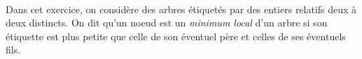 \documentclass[11pt,a4paper]{article}
\begin{document}
\begin{Exercise}[title = {Minima locaux dans des arbres}, origin = {\bac \; Oraux {\sc ccinp}}]\\
Dans cet exercice, on considère des arbres étiquetés par des entiers relatifs deux à deux distincts. On dit qu'un noeud est un \textit{minimum local} d'un arbre si son étiquette est plus petite que celle de son éventuel père et celles de ses éventuels fils.



\end{Exercise}
\end{document}
